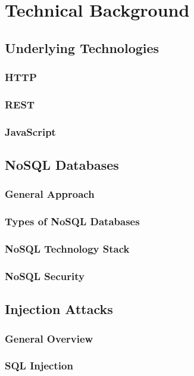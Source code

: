 \chapter{Technical Background}
\label{cha:technicalBackground}

\section{Underlying Technologies}
\subsection{HTTP}
\subsection{REST}
\subsection{JavaScript}

\section{NoSQL Databases}
\subsection{General Approach}
\subsection{Types of NoSQL Databases}
\subsection{NoSQL Technology Stack}
\subsection{NoSQL Security}

\section{Injection Attacks}
\subsection{General Overview}
\subsection{SQL Injection}


